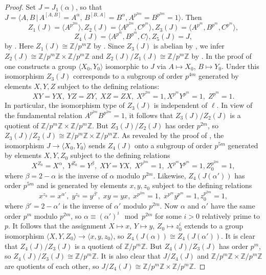 \documentclass{amsart}
\theoremstyle{definition}
\theoremstyle{remark}
\newcommand \Z{{\mathbb Z}}
\begin{document}
\begin{proof} Set $J=J_1(\alpha)$, so that
$J=\langle A,B\,|\, A^{[A,B]}=A^{\alpha},\, B^{[B,A]}=B^{\alpha}, A^{p^{3m}}=B^{p^{3m}}=1\rangle$. Then
$$
Z_1(J)=\langle A^{p^{2m}}\rangle, Z_2(J)=\langle A^{p^{2m}},C^{p^{m}}\rangle,
Z_3(J)=\langle  A^{p^{m}}, B^{p^{m}}, C^{p^{m}}\rangle,
$$
$$
Z_4(J)=\langle  A^{p^{m}}, B^{p^{m}}, C\rangle, Z_5(J)=J,
$$
by \cite[Theorem 8.1]{MS}. Here $Z_1(J)\cong\Z/p^m\Z$ by
\cite[Proposition 7.2]{MS}. Since $Z_3(J)$ is abelian by \cite[Proposition 9.1]{MS}, we infer
$Z_2(J)\cong\Z/p^m\Z\times \Z/p^m\Z$ and $Z_2(J)/Z_1(J)\cong\Z/p^m\Z$ by
\cite[Proposition 7.2]{MS}. In the proof of \cite[Theorem 11.1]{MS} one constructs a group
$\langle X_0,Y_0\rangle$ isomorphic to $J$ via $A\mapsto X_0$, $B\mapsto Y_0$. Under this isomorphism
$Z_3(J)$ corresponds to a subgroup of order $p^{4m}$ generated by elements $X,Y,Z$ subject to the
defining relations:
$$
XY=YX,\; YZ=ZY,\; XZ=ZX,\; X^{p^{2m}}=1, X^{p^{m}}Y^{p^{m}}=1,\;  Z^{p^{m}}=1.
$$
In particular, the isomorphism type of $Z_3(J)$ is independent of $\ell$. In view of the fundamental
relation $A^{p^{2m}}B^{p^{2m}}=1$, it follows that $Z_3(J)/Z_2(J)$ is a quotient of $\Z/p^m\Z\times \Z/p^m\Z$.
But $Z_3(J)/Z_2(J)$ has order $p^{2m}$, so $Z_3(J)/Z_2(J)\cong\Z/p^m\Z\times \Z/p^m\Z$. As revealed by the proof of \cite[Theorem 11.1]{MS},
the isomorphism
$J\to \langle X_0,Y_0\rangle$ sends $Z_4(J)$ onto a subgroup of order $p^{5m}$ generated by elements $X,Y,Z_0$ subject to the defining relations
$$
X^{Z_0}=X^\alpha,\; Y^{Z_0}=Y^{\beta},\; XY=YX,\; X^{p^{2m}}=1,\; X^{p^{m}}Y^{p^{m}}=1,
Z_0^{p^{2m}}=1,
$$
where $\beta=2-\alpha$ is the inverse of $\alpha$ modulo $p^{2m}$. Likewise, $Z_4(J(\alpha'))$ has order $p^{5m}$ and
is generated by elements $x,y,z_0$ subject to the defining relations
$$
x^{z_0}=x^{\alpha'},\; y^{z_0}=y^{\beta'},\; xy=yx,\; x^{p^{2m}}=1,\; x^{p^{m}}y^{p^{m}}=1,
z_0^{p^{2m}}=1,
$$
where $\beta'=2-\alpha'$ is the inverse of $\alpha'$ modulo $p^{2m}$. Now $\alpha$ and $\alpha'$ have the same order $p^m$ modulo $p^{2m}$,
so $\alpha\equiv (\alpha')^i\mod p^{2m}$ for some $i>0$ relatively prime to $p$. It follows that the assignment
$X\mapsto x$, $Y\mapsto y$, $Z_0\mapsto z_0^i$ extends to a group isomorphism $\langle X,Y,Z_0\rangle\to \langle x,y,z_0\rangle$,
so $Z_4(J(\alpha))\cong Z_4(J(\alpha'))$.  It is clear that $Z_4(J)/Z_3(J)$ is a quotient of $\Z/p^m\Z$.
But $Z_4(J)/Z_3(J)$ has order $p^m$, so $Z_4(J)/Z_3(J)\cong\Z/p^m\Z$. It is also clear that
$J/Z_4(J)$ and $\Z/p^m\Z\times \Z/p^m\Z$ are quotients of each other, so $J/Z_4(J)\cong \Z/p^m\Z\times \Z/p^m\Z$.
\end{proof}
\end{document}
